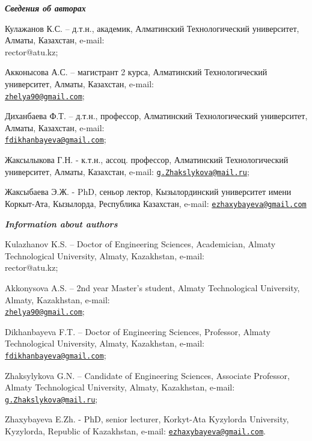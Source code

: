 \begin{authorinfo}
\emph{{\bfseries Сведения об авторах}}

Кулажанов К.С. -- д.т.н., академик, Алматинский Технологический
университет, Алматы, Казахстан, e-mail: \\rector@atu.kz;

Акконысова А.С. -- магистрант 2 курса, Алматинский Технологический
университет, Алматы, Казахстан, e-mail:\\
\href{mailto:zhelya90@gmail.com}{\nolinkurl{zhelya90@gmail.com}};

Диханбаева Ф.Т. -- д.т.н., профессор, Алматинский Технологический
университет, Алматы, Казахстан, e-mail:\\
\href{mailto:fdikhanbayeva@gmail.com}{\nolinkurl{fdikhanbayeva@gmail.com}};

Жаксылыкова Г.Н. - к.т.н., ассоц. профессор, Алматинский Технологический
университет, Алматы, Казахстан, e-mail:
\href{mailto:g.Zhakslykova@mail.ru}{\nolinkurl{g.Zhakslykova@mail.ru}};

Жаксыбаева Э.Ж. - PhD, сеньор лектор, Кызылординский университет имени
Коркыт-Ата, Кызылорда, Республика Казахстан, e-mail:
\href{mailto:ezhaxybayeva@gmail.com}{\nolinkurl{ezhaxybayeva@gmail.com}}

\emph{{\bfseries Information about authors}}

Kulazhanov K.S. -- Doctor of Engineering Sciences, Academician, Almaty
Technological University, Almaty, Kazakhstan, e-mail:\\ rector@atu.kz;

Akkonysova A.S. -- 2nd year Master's student, Almaty Technological
University, Almaty, Kazakhstan, e-mail:\\
\href{mailto:zhelya90@gmail.com}{\nolinkurl{zhelya90@gmail.com}};

Dikhanbayeva F.T. -- Doctor of Engineering Sciences, Professor, Almaty
Technological University, Almaty, Kazakhstan, e-mail:
\href{mailto:fdikhanbayeva@gmail.com}{\nolinkurl{fdikhanbayeva@gmail.com}};

Zhaksylykova G.N. -- Candidate of Engineering Sciences, Associate
Professor, Almaty Technological University, Almaty, Kazakhstan, e-mail:
\href{mailto:g.Zhakslykova@mail.ru}{\nolinkurl{g.Zhakslykova@mail.ru}};

Zhaxybayeva E.Zh. - PhD, senior lecturer, Korkyt-Ata Kyzylorda
University, Kyzylorda, Republic of Kazakhstan, e-mail:
\href{mailto:ezhaxybayeva@gmail.com}{\nolinkurl{ezhaxybayeva@gmail.com}}.
\end{authorinfo}
